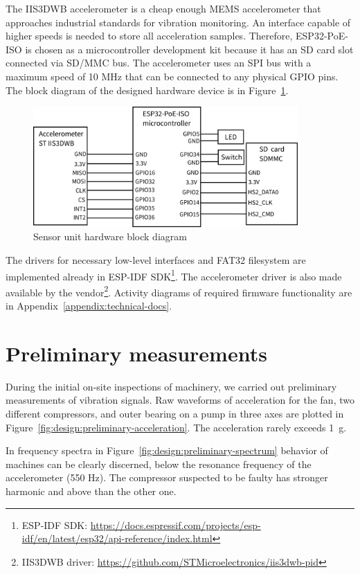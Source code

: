 The IIS3DWB accelerometer is a cheap enough MEMS accelerometer that approaches industrial standards for vibration monitoring. An interface capable of higher speeds is needed to store all acceleration samples. Therefore, ESP32-PoE-ISO is chosen as a microcontroller development kit because it has an SD card slot connected via SD/MMC bus. The accelerometer uses an SPI bus with a maximum speed of 10 MHz that can be connected to any physical GPIO pins. The block diagram of the designed hardware device is in Figure~\ref{fig:design:block-diagram-hw}.

\begin{figure}[h]
	\centering
	\includegraphics[width=0.9\textwidth]{assets/design/hw-block-schematic.png}
	\caption{Sensor unit hardware block diagram}
	\label{fig:design:block-diagram-hw}
\end{figure}

The drivers for necessary low-level interfaces and FAT32 filesystem are  implemented already in ESP-IDF SDK\footnote{ESP-IDF SDK: \url{https://docs.espressif.com/projects/esp-idf/en/latest/esp32/api-reference/index.html}}. The accelerometer driver is also made available by the vendor\footnote{IIS3DWB driver: \url{https://github.com/STMicroelectronics/iis3dwb-pid}}. Activity diagrams of required firmware functionality are in Appendix~\ref{appendix:technical-docs}.

\section{Preliminary measurements}
During the initial on-site inspections of machinery, we carried out preliminary measurements of vibration signals. Raw waveforms of acceleration for the fan, two different compressors, and outer bearing on a pump in three axes are plotted in Figure~\ref{fig:design:preliminary-acceleration}. The acceleration rarely exceeds 1~g. 

In frequency spectra in Figure~\ref{fig:design:preliminary-spectrum} behavior of machines can be clearly discerned, below the resonance frequency of the accelerometer (550 Hz). The compressor suspected to be faulty has stronger  harmonic and above than the other one.


